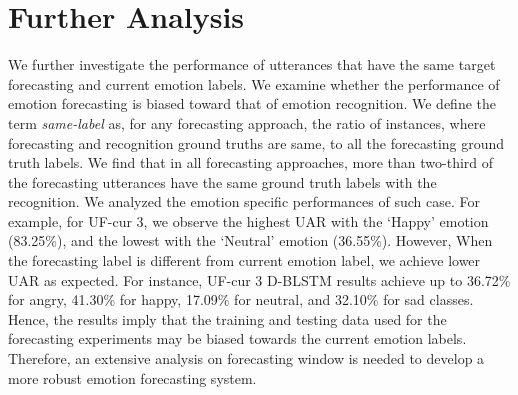 


\section{Further Analysis}
We further investigate the performance of utterances that have the same target forecasting and current emotion labels. We examine whether the performance of emotion forecasting is biased toward that of emotion recognition. We define the term \textit{same-label} as, for any forecasting approach, the ratio of instances, where forecasting and recognition ground truths are same, to all the forecasting ground truth labels. We find that in all forecasting approaches, more than two-third of the forecasting utterances have the same ground truth labels with the recognition. We analyzed the emotion specific performances of such case. For example, for UF-cur 3, we observe the highest UAR with the `Happy' emotion (83.25\%), and the lowest with the `Neutral' emotion (36.55\%). However, When the forecasting label is different from current emotion label, we achieve lower UAR as expected. For instance, UF-cur 3 D-BLSTM results achieve up to 36.72\% for angry, 41.30\% for happy, 17.09\% for neutral, and 32.10\% for sad classes. Hence, the results imply that the training and testing data used for the forecasting experiments may be biased towards the current emotion labels. Therefore, an extensive analysis on forecasting window is needed to develop a more robust emotion forecasting system. 

